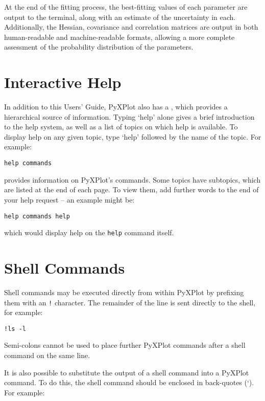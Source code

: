 At the end of the fitting process, the best-fitting values of each parameter
are output to the terminal, along with an estimate of the uncertainty in each.
Additionally, the Hessian, covariance and correlation matrices are output in
both human-readable and machine-readable formats, allowing a more complete
assessment of the probability distribution of the parameters.

\section{Interactive Help}

In addition to this Users' Guide, PyXPlot also has a ,
which provides a hierarchical source of information. Typing `help' alone gives a
brief introduction to the help system, as well as a list of topics on which
help is available. To display help on any given topic, type `help' followed by
the name of the topic. For example:

\begin{verbatim}
help commands
\end{verbatim}

\noindent provides information on PyXPlot's commands. Some topics have
subtopics, which are listed at the end of each page. To view them, add further
words to the end of your help request -- an example might be:

\begin{verbatim}
help commands help
\end{verbatim}

\noindent which would display help on the {\tt help} command itself.

\section{Shell Commands}

Shell commands may be executed directly from
within PyXPlot by prefixing them with an {\tt !} character\indcmd{!}. The
remainder of the line is sent directly to the shell, for example:

\begin{verbatim}
!ls -l
\end{verbatim}

Semi-colons cannot be used to place further PyXPlot commands after a shell
command on the same line.

It is also possible to substitute the output of a shell command into a PyXPlot
command. To do this, the shell command should be enclosed in back-quotes (`).
For example:

